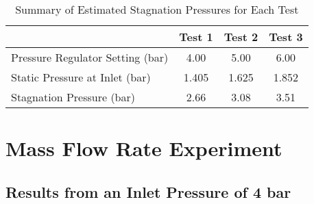 \begin{table}[htbp]
    \centering
    \begin{tabular}{l c c c}
        \hline
        & Test 1 & Test 2 & Test 3 \\
        \hline
        Pressure Regulator Setting (bar) & 4.00 & 5.00 & 6.00 \\
        Static Pressure at Inlet (bar) & 1.405 & 1.625 & 1.852 \\
        Stagnation Pressure (bar) & 2.66 & 3.08 & 3.51 \\
        \hline
    \end{tabular}
    \caption{Summary of Estimated Stagnation Pressures for Each Test}\label{tab:static-stag-pressures}
\end{table}


\newpage

\section{Mass Flow Rate Experiment}
\subsection{Results from an Inlet Pressure of 4 bar}
\vfill

